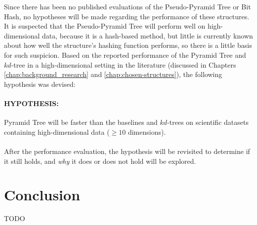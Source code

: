 Since there has been no published evaluations of the Pseudo-Pyramid Tree or Bit Hash, no hypotheses will be made regarding the performance of these structures. It is suspected that the Pseudo-Pyramid Tree will perform well on high-dimensional data, because it is a hash-based method, but little is currently known about how well the structure's hashing function performs, so there is a little basis for such suspicion. Based on the reported performance of the Pyramid Tree and $kd$-tree in a high-dimensional setting in the literature (discussed in Chapters \ref{chap:background_research} and \ref{chap:chosen-structures}), the following hypothesis was devised:

\paragraph{\textbf{HYPOTHESIS:}} Pyramid Tree will be faster than the baselines and $kd$-trees on scientific datasets containing high-dimensional data ($\geq 10$ dimensions).

\paragraph{}

After the performance evaluation, the hypothesis will be revisited to determine if it still holds, and \textit{why} it does or does not hold will be explored.

\section{Conclusion}

TODO
